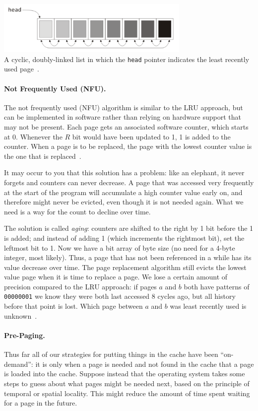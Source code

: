 \begin{center}
\includegraphics[width=0.7\textwidth]{images/lru-linkedlist.png}\\
A cyclic, doubly-linked list in which the \texttt{head} pointer indicates the least recently used page~\cite{mte241}.
\end{center}

\paragraph{Not Frequently Used (NFU).}
The not frequently used (NFU) algorithm is similar to the LRU approach, but can be implemented in software rather than relying on hardware support that may not be present. Each page gets an associated software counter, which starts at 0. Whenever the $R$ bit would have been updated to 1, 1 is added to the counter. When a page is to be replaced, the page with the lowest counter value is the one that is replaced~\cite{mos}. 

It may occur to you that this solution has a problem: like an elephant, it never forgets and counters can never decrease. A page that was accessed very frequently at the start of the program will accumulate a high counter value early on, and therefore might never be evicted, even though it is not needed again. What we need is a way for the count to decline over time. 

The solution is called \textit{aging}: counters are shifted to the right by 1 bit before the 1 is added; and instead of adding 1 (which increments the rightmost bit), set the leftmost bit to 1. Now we have a bit array of byte size (no need for a 4-byte integer, most likely). Thus, a page that has not been referenced in a while has its value decrease over time. The page replacement algorithm still evicts the lowest value page when it is time to replace a page. We lose a certain amount of precision compared to the LRU approach: if pages $a$ and $b$ both have patterns of \texttt{00000001} we know they were both last accessed 8 cycles ago, but all history before that point is lost. Which page between $a$ and $b$ was least recently used is unknown~\cite{mos}. 

\paragraph{Pre-Paging.}
Thus far all of our strategies for putting things in the cache have been ``on-demand'': it is only when a page is needed and not found in the cache that a page is loaded into the cache. Suppose instead that the operating system takes some steps to guess about what pages might be needed next, based on the principle of temporal or spatial locality. This might reduce the amount of time spent waiting for a page in the future.

